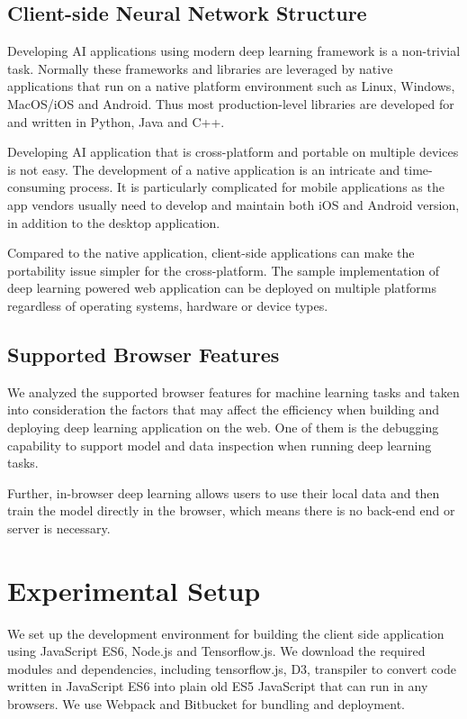 \subsection{Client-side Neural Network Structure}
Developing AI applications using modern deep learning framework is a non-trivial task. Normally these frameworks and libraries are leveraged by native applications that run on a native platform environment such as Linux, Windows, MacOS/iOS and Android. Thus most production-level libraries are developed for and written in Python, Java and C++. 

Developing AI application that is cross-platform and portable on multiple devices is not easy. The development of a native application is an intricate and time-consuming process. It is particularly complicated for mobile applications as the app vendors usually need to develop and maintain both iOS and Android version, in addition to the desktop application.

Compared to the native application, client-side applications can make the portability issue simpler for the cross-platform. The sample implementation of deep learning powered web application can be deployed on multiple platforms regardless of operating systems, hardware or device types.

\subsection{Supported Browser Features}
We analyzed the supported browser features for machine learning tasks and taken into consideration the factors that may affect the efficiency when building and deploying deep learning application on the web. One of them is the debugging capability to support model and data inspection when running deep learning tasks.

Further, in-browser deep learning allows users to use their local data and then train the model directly in the browser, which means there is no back-end end or server is necessary. 

\section{Experimental Setup}

We set up the development environment for building the client side application using JavaScript ES6, Node.js and Tensorflow.js. We download the required modules and dependencies, including tensorflow.js, D3, transpiler to convert code written in JavaScript ES6 into plain old ES5 JavaScript that can run in any browsers. We use Webpack and Bitbucket for bundling and deployment.

